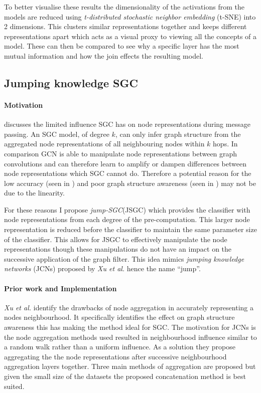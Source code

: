 To better visualise these results the dimensionality of the activations from the models are reduced using \emph{t-distributed stochastic neighbor embedding} (t-SNE) into 2 dimensions.
This clusters similar representations together and keeps different representations apart which acts as a visual proxy to viewing all the concepts of a model.
These can then be compared to see why a specific layer has the most mutual information and how the join effects the resulting model.

\subsection{Jumping knowledge SGC}
\paragraph{Motivation}
 discusses the limited influence SGC has on node representations during message passing.
An SGC model, of degree $k$, can only infer graph structure from the aggregated node representations of all neighbouring nodes within $k$ hops.
In comparison GCN is able to manipulate node representations between graph convolutions and can therefore learn to amplify or dampen differences between node representations which SGC cannot do.
Therefore a potential reason for the low accuracy (seen in ) and poor graph structure awareness (seen in ) may not be due to the linearity.

For these reasons I propose \emph{jump-SGC}(JSGC) which provides the classifier with node representations from each degree of the pre-computation.
This larger node representation is reduced before the classifier to maintain the same parameter size of the classifier.
This allows for JSGC to effectively manipulate the node representations though these manipulations do not have an impact on the successive application of the graph filter.
This idea mimics \emph{jumping knowledge networks} (JCNs) proposed by \textit{Xu et al.}\cite{xu2018representation} hence the name ``jump''.

\paragraph{Prior work and Implementation}
\textit{Xu et al.}\cite{xu2018representation} identify the drawbacks of node aggregation in accurately representing a nodes neighbourhood.
It specifically identifies the effect on graph structure awareness this has making the method ideal for SGC.
The motivation for JCNs is the node aggregation methods used resulted in neighbourhood influence similar to a random walk rather than a uniform influence.
As a solution they propose aggregating the the node representations after successive neighbourhood aggregation layers together.
Three main methods of aggregation are proposed but given the small size of the datasets the proposed concatenation method is best suited.


